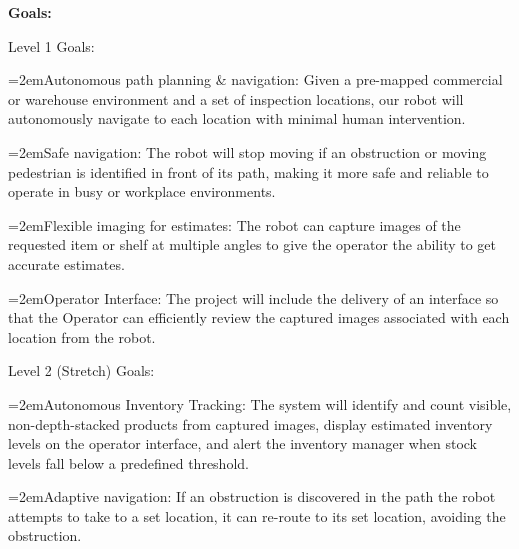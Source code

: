 \documentclass[12pt,a4paper]{article}
\begin{document}
\noindent \textbf{Goals:}\par
\noindent Level 1 Goals:\par
\par\noindent\hangindent=2em\hspace*{1em}\textbullet\hspace{0.5em}Autonomous path planning \& navigation: Given a pre-mapped commercial or warehouse environment and a set of inspection locations, our robot will autonomously navigate to each location with minimal human intervention.\par
\par\noindent\hangindent=2em\hspace*{1em}\textbullet\hspace{0.5em}Safe navigation: The robot will stop moving if an obstruction or moving pedestrian is identified in front of its path, making it more safe and reliable to operate in busy or workplace environments.\par
\par\noindent\hangindent=2em\hspace*{1em}\textbullet\hspace{0.5em}Flexible imaging for estimates: The robot can capture images of the requested item or shelf at multiple angles to give the operator the ability to get accurate estimates.\par
\par\noindent\hangindent=2em\hspace*{1em}\textbullet\hspace{0.5em}Operator Interface: The project will include the delivery of an interface so that the Operator can efficiently review the captured images associated with each location from the robot.\par
\noindent Level 2 (Stretch) Goals:\par
\par\noindent\hangindent=2em\hspace*{1em}\textbullet\hspace{0.5em}Autonomous Inventory Tracking: The system will identify and count visible, non-depth-stacked products from captured images, display estimated inventory levels on the operator interface, and alert the inventory manager when stock levels fall below a predefined threshold.\par
\par\noindent\hangindent=2em\hspace*{1em}\textbullet\hspace{0.5em}Adaptive navigation: If an obstruction is discovered in the path the robot attempts to take to a set location, it can re-route to its set location, avoiding the obstruction.\par
\end{document}
